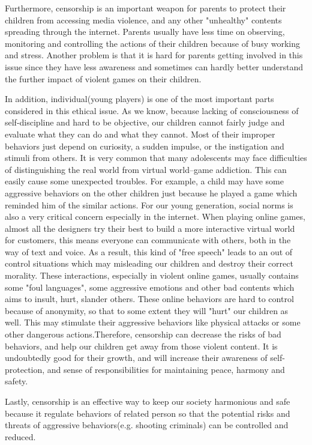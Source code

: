Furthermore, censorship is an important weapon for parents to protect their children from accessing media violence, and any other "unhealthy" contents spreading through the internet. Parents usually have less time on observing, monitoring and controlling the actions of their children because of busy working and stress. Another problem is that it is hard for parents getting involved in this issue since they have less awareness and sometimes can hardly better understand the further impact of violent games on their children.

In addition, individual(young players) is one of the most important parts considered in this ethical issue. As we know, because lacking of consciousness of self-discipline and hard to be objective, our children cannot fairly judge and evaluate what they can do and what they cannot. Most of their improper behaviors just depend on curiosity,  a sudden impulse, or the instigation and stimuli from others. It is very common that many adolescents may face difficulties of distinguishing the real world from virtual world--game addiction. This can easily cause some unexpected troubles. For example, a child may have some aggressive behaviors on the other children just because he played a game which reminded him of the similar actions. For our young generation, social norms is also a very critical concern especially in the internet. When playing online games, almost all the designers try their best to build a more interactive virtual world for customers, this means everyone can communicate with others, both in the way of text and voice. As a result, this kind of "free speech" leads to an out of control situations which may misleading our children and destroy their correct morality. These interactions, especially in violent online games, usually contains some "foul languages", some aggressive emotions and other bad contents which aims to insult, hurt, slander others. These online behaviors are hard to control because of anonymity, so that to some extent they will "hurt" our children as well. This may stimulate their aggressive behaviors like physical attacks or some other dangerous actions.Therefore, censorship can decrease the risks of bad behaviors, and help our children get away from those violent content. It is undoubtedly good for their growth, and will increase their awareness of self-protection, and sense of responsibilities for  maintaining peace, harmony and safety.

Lastly, censorship is an effective way to keep our society harmonious and safe because it regulate behaviors of related person so that the potential risks and threats of aggressive behaviors(e.g. shooting criminals) can be controlled and reduced.

